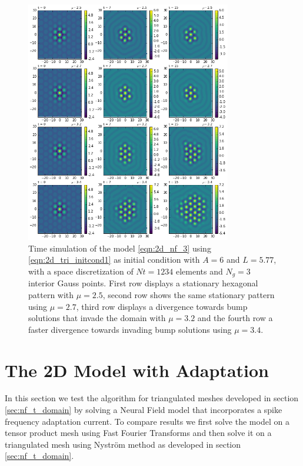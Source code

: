 \documentclass{uonmathreport}
\begin{document}
\begin{figure}[H]
	\begin{center}
		\includegraphics[width=0.8\textwidth]{Figures/2dTri_IC2_1234elems.png}
	\end{center}
	\caption{Time simulation of the model \ref{eqn:2d_nf_3} using \ref{eqn:2d_tri_initcond1} as initial condition with $A=6$ and $L=5.77$, with a space discretization of $Nt=1234$ elements and $N_g=3$ interior Gauss points. First row displays a stationary hexagonal pattern with $\mu=2.5$, second row shows the same stationary pattern using $\mu=2.7$, third row displays a divergence towards bump solutions that invade the domain with $\mu=3.2$ and the fourth row a faster divergence towards invading bump solutions using $\mu = 3.4$.}
	\label{fig:2dTri_ic2_1234}
\end{figure}
\section{The 2D Model with Adaptation} \label{sec:2d_adaptation}
In this section we test the algorithm for triangulated meshes developed in section \ref{sec:nf_t_domain} by solving a Neural Field model that incorporates a spike frequency adaptation current. To compare results we first solve the model on a tensor product mesh using Fast Fourier Transforms and then solve it on a triangulated mesh using Nystr\"om method as developed in section \ref{sec:nf_t_domain}.
\end{document}
